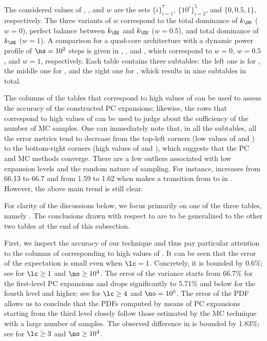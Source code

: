 The considered values of \lc, \no, and $w$ are the sets $\{ i \}_{i = 1}^7$, $\{
10^i \}_{i = 2}^5$, and $\{ 0, 0.5, 1 \}$, respectively. The three variants of
$w$ correspond to the total dominance of $k_\OU$ ($w = 0$), perfect balance
between $k_\SE$ and $k_\OU$ ($w = 0.5$), and total dominance of $k_\SE$ ($w =
1$). A comparison for a quad-core architecture with a dynamic power profile of
$\ns = 10^2$ steps is given in ,
, and ,
which correspond to $w = 0$, $w = 0.5$, and $w = 1$, respectively. Each table
contains three subtables: the left one is for \error{\expectation}, the middle
one for \error{\variance}, and the right one for , which results in
nine subtables in total.

The columns of the tables that correspond to high values of \no can be used to
assess the accuracy of the constructed \ac{PC} expansions; likewise, the rows
that correspond to high values of \lc can be used to judge about the sufficiency
of the number of \ac{MC} samples. One can immediately note that, in all the
subtables, all the error metrics tend to decrease from the top-left corners (low
values of \lc and \no) to the bottom-right corners (high values of \lc and \no),
which suggests that the \ac{PC} and \ac{MC} methods converge. There are a few
outliers associated with low expansion levels and the random nature of sampling.
For instance, \error{\variance} increases from 66.13 to 66.7 and  from
1.59 to 1.62 when \no makes a transition from  to  in
. However, the above main trend is still
clear.

For clarity of the discussions below, we focus primarily on one of the three
tables, namely . The conclusions drawn with
respect to  are to be generalized to the
other two tables at the end of this subsection.

First, we inspect the accuracy of our technique and thus pay particular
attention to the columns of  corresponding to
high values of \no. It can be seen that the error of the expectation is small
even when $\lc = 1$. Concretely, it is bounded by 0.6\%; see
\error{\expectation} for $\lc \geq 1$ and $\no \geq 10^4$. The error of the
variance starts from 66.7\% for the first-level \ac{PC} expansions and drops
significantly to 5.71\% and below for the fourth level and higher; see
\error{\variance} for $\lc \geq 4$ and $\no = 10^5$. The error of the \ac{PDF}
allows us to conclude that the \acp{PDF} computed by means of \ac{PC} expansions
starting from the third level closely follow those estimated by the \ac{MC}
technique with a large number of samples. The observed difference in
 is bounded by 1.83\%; see  for $\lc
\geq 3$ and $\no \geq 10^4$.

